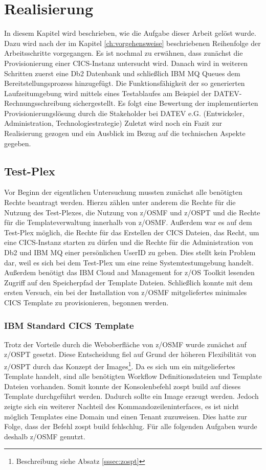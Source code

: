 \chapter{Realisierung}\label{ch:realisierung}
In diesem Kapitel wird beschrieben, wie die Aufgabe dieser Arbeit gelöst wurde.
Dazu wird nach der im Kapitel \ref{ch:vorgehensweise} beschriebenen Reihenfolge der Arbeitsschritte vorgegangen.
Es ist nochmal zu erwähnen, dass zunächst die Provisionierung einer CICS-Instanz untersucht wird.
Danach wird in weiteren Schritten zuerst eine Db2 Datenbank und schließlich IBM MQ Queues dem Bereitstellungsprozess hinzugefügt.
Die Funktionsfähigkeit der so generierten Laufzeitumgebung wird mittels eines Testablaufes am Beispiel der DATEV-Rechnungsschreibung  sichergestellt. 
Es folgt eine Bewertung der implementierten Provisionierungslösung durch die Stakeholder bei DATEV e.G. (Entwickeler, Administration, Technologiestrategie)
Zuletzt wird noch ein Fazit zur Realisierung gezogen und ein Ausblick im Bezug auf die technischen Aspekte gegeben.

\section{Test-Plex}
Vor Beginn der eigentlichen Untersuchung mussten zunächst alle benötigten Rechte beantragt werden.
Hierzu zählen unter anderem die Rechte für die Nutzung des Test-Plexes, die Nutzung von z/OSMF und z/OSPT und die Rechte für die Templateverwaltung innerhalb von z/OSMF.
Außerdem war es auf dem Test-Plex möglich, die Rechte für das Erstellen der CICS Dateien, das Recht, um eine CICS-Instanz starten zu dürfen und die Rechte für die Administration von Db2 und IBM MQ einer persönlichen UserID zu geben.
Dies stellt kein Problem dar, weil es sich bei dem Test-Plex um eine reine Systemtestumgebung handelt.
Außerdem benötigt das IBM Cloud and Management for z/OS Toolkit lesenden Zugriff auf den Speicherpfad der Template Dateien.
Schließlich konnte mit dem ersten Versuch, ein bei der Installation von z/OSMF mitgeliefertes minimales CICS Template zu provisionieren, begonnen werden.

\subsection{IBM Standard CICS Template}
Trotz der Vorteile durch die Weboberfläche von z/OSMF wurde zunächst auf z/OSPT gesetzt.
Diese Entscheidung fiel auf Grund der höheren Flexibilität von z/OSPT durch das Konzept der Images\footnote{Beschreibung siehe Absatz \ref{sssec:zospt}}.
Da es sich um ein mitgeliefertes Template handelt, sind alle benötigten Workflow Definitionsdateien und Template Dateien vorhanden.
Somit konnte der Konsolenbefehl \glqq zospt build\grqq{} auf dieses Template durchgeführt werden.
Dadurch sollte ein Image erzeugt werden.
Jedoch zeigte sich ein weiterer Nachteil des Kommandozeileninterfaces, es ist nicht möglich Templates eine Domain und einen Tenant zuzuweisen.
Dies hatte zur Folge, dass der Befehl \glqq zospt build\grqq{} fehlschlug.
Für alle folgenden Aufgaben wurde deshalb z/OSMF genutzt.

